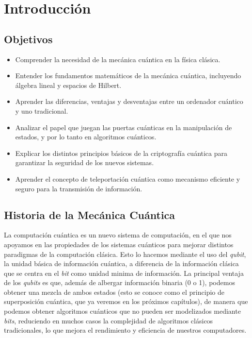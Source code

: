 \documentclass[12pt]{article}
\numberwithin{equation}{section} %
\begin{document}
    \thispagestyle{empty}
    \section{Introducción}
        \subsection{Objetivos}

        \vspace{5mm}

        \begin{itemize}
            \item Comprender la necesidad de la mecánica cuántica en la física clásica.
            \item Entender los fundamentos matemáticos de la mecánica cuántica, incluyendo álgebra lineal y espacios de Hilbert.
            \item Aprender las diferencias, ventajas y desventajas entre un ordenador cuántico y uno tradicional.
            \item Analizar el papel que juegan las puertas cuánticas en la manipulación de estados, y por lo tanto en algoritmos cuánticos.
            \item Explicar los distintos principios básicos de la criptografía cuántica para garantizar la seguridad de los nuevos sistemas.
            \item Aprender el concepto de teleportación cuántica como mecanismo eficiente y seguro para la transmisión de información.
        \end{itemize}

        \vspace{5mm}

        \subsection{Historia de la Mecánica Cuántica}\label{sec: historia}

        \vspace{5mm}

        La computación cuántica es un nuevo sistema de computación, en el que nos apoyamos en las propiedades de los sistemas cuánticos para mejorar distintos paradigmas de la computación clásica. Esto lo hacemos mediante el uso del \textit{qubit}, la unidad básica de información cuántica, a diferencia de la información clásica que se centra en el \textit{bit} como unidad minima de información. La principal ventaja de los \textit{qubits} es que, además de albergar información binaria (0 o 1), podemos obtener una mezcla de ambos estados (esto se conoce como el principio de superposición cuántica, que ya veremos en los próximos capítulos), de manera que podemos obtener algoritmos cuánticos que no pueden ser modelizados mediante \textit{bits}, reduciendo en muchos casos la complejidad de algoritmos clásicos tradicionales, lo que mejora el rendimiento y eficiencia de nuestros computadores.
\end{document}
